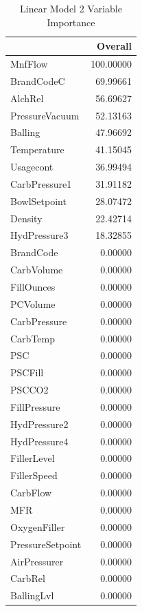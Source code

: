 \documentclass[]{report}
\begin{document}
\begin{table}[H]

\caption{\label{tab:project2a16}Linear Model 2 Variable Importance}
\centering
\begin{tabular}[t]{l|r}
\hline
  & Overall\\
\hline
\rowcolor{gray!6}  MnfFlow & 100.00000\\
\hline
BrandCodeC & 69.99661\\
\hline
\rowcolor{gray!6}  AlchRel & 56.69627\\
\hline
PressureVacuum & 52.13163\\
\hline
\rowcolor{gray!6}  Balling & 47.96692\\
\hline
Temperature & 41.15045\\
\hline
\rowcolor{gray!6}  Usagecont & 36.99494\\
\hline
CarbPressure1 & 31.91182\\
\hline
\rowcolor{gray!6}  BowlSetpoint & 28.07472\\
\hline
Density & 22.42714\\
\hline
\rowcolor{gray!6}  HydPressure3 & 18.32855\\
\hline
BrandCode & 0.00000\\
\hline
\rowcolor{gray!6}  CarbVolume & 0.00000\\
\hline
FillOunces & 0.00000\\
\hline
\rowcolor{gray!6}  PCVolume & 0.00000\\
\hline
CarbPressure & 0.00000\\
\hline
\rowcolor{gray!6}  CarbTemp & 0.00000\\
\hline
PSC & 0.00000\\
\hline
\rowcolor{gray!6}  PSCFill & 0.00000\\
\hline
PSCCO2 & 0.00000\\
\hline
\rowcolor{gray!6}  FillPressure & 0.00000\\
\hline
HydPressure2 & 0.00000\\
\hline
\rowcolor{gray!6}  HydPressure4 & 0.00000\\
\hline
FillerLevel & 0.00000\\
\hline
\rowcolor{gray!6}  FillerSpeed & 0.00000\\
\hline
CarbFlow & 0.00000\\
\hline
\rowcolor{gray!6}  MFR & 0.00000\\
\hline
OxygenFiller & 0.00000\\
\hline
\rowcolor{gray!6}  PressureSetpoint & 0.00000\\
\hline
AirPressurer & 0.00000\\
\hline
\rowcolor{gray!6}  CarbRel & 0.00000\\
\hline
BallingLvl & 0.00000\\
\hline
\end{tabular}
\end{table}
\end{document}
